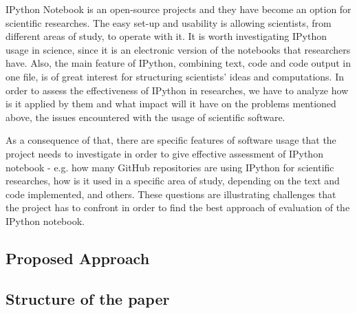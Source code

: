 IPython Notebook is an open-source projects and they have become an option for scientific researches. The easy set-up and usability is allowing scientists, from different areas of study, to operate with it. It is worth investigating IPython usage in science, since it is an electronic version of the notebooks that researchers have. Also, the main feature of IPython, combining text, code and code output in one file, is of great interest for structuring scientists' ideas and computations. In order to assess the effectiveness of IPython in researches, we have to analyze how is it applied by them and what impact will it have on the problems mentioned above, the issues encountered with the usage of scientific software. 

As a consequence of that, there are specific features of software usage that the project needs to investigate in order to give effective assessment of IPython notebook - e.g. how many GitHub repositories are using IPython for scientific researches, how is it used in a specific area of study, depending on the text and code implemented, and others. These questions are illustrating challenges that the project has to confront in order to find the best approach of evaluation of the IPython notebook.  

\subsection{Proposed Approach}

\subsection{Structure of the paper}